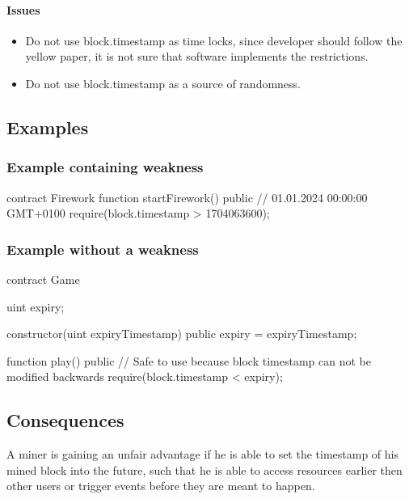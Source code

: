 \paragraph{Issues}

\begin{itemize}
\item Do not use block.timestamp as time locks, since developer should follow the yellow paper, it is not sure that software implements the restrictions.
\item Do not use block.timestamp as a source of randomness.
\end{itemize}

\subsection{Examples}
\subsubsection{Example containing weakness}
\begin{solidity}
    contract Firework {
        function startFirework() public {
            // 01.01.2024 00:00:00 GMT+0100
            require(block.timestamp > 1704063600);
        }
    }
\end{solidity}

\subsubsection{Example without a weakness}
\begin{solidity}
    contract Game {
        uint expiry;
    
        constructor(uint expiryTimestamp) public {
            expiry = expiryTimestamp;
        }
    
        function play() public {
            // Safe to use because block timestamp can not be modified backwards
            require(block.timestamp < expiry);
        }
    }
\end{solidity}
    
\subsection{Consequences}
A miner is gaining an unfair advantage if he is able to set the timestamp
of his mined block into the future, such that he is able to access
resources earlier then other users or trigger events before they are meant to happen.